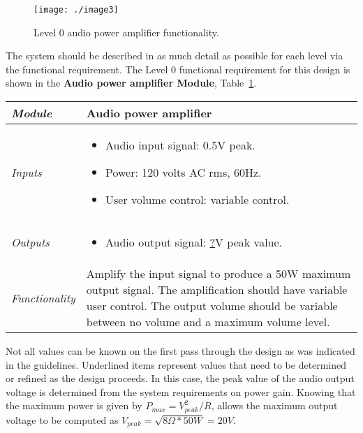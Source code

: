 \begin{figure}[h]
\centering
\texttt{[image: ./image3]}
\caption{Level 0 audio power amplifier functionality.}
\label{figure:level0PowerAmp}
\end{figure}

The system should be described in as much detail as possible for each
level via the functional requirement. The Level 0 functional requirement
for this design is shown in the \textbf{Audio power amplifier Module},
Table~\ref{table:functionalRequirementsAudioPowerAmplifier}.

\begin{table}[h]
\label{table:functionalRequirementsAudioPowerAmplifier}
\begin{tabular}{|l|m{10cm}|}
\hline
\emph{Module} &
Audio power amplifier \\ \hline

\emph{Inputs} & 
\begin{itemize}
\item
  Audio input signal: 0.5V peak.
\item
  Power: 120 volts AC rms, 60Hz.
\item
  User volume control: variable control.
\end{itemize} \\ \hline

\emph{Outputs} & 
\begin{itemize}
\item
  Audio output signal: \ul{?}V peak value.
\end{itemize}  \\ \hline

\emph{Functionality} & Amplify the input signal to produce a 50W maximum
output signal. The amplification should have variable user control. The
output volume should be variable between no volume and a maximum volume
level. \\ \hline
\end{tabular}
\end{table}

Not all values can be known on the first pass through the design as was
indicated in the guidelines. Underlined items represent values that need
to be determined or refined as the design proceeds. In this case, the
peak value of the audio output voltage is determined from the system
requirements on power gain. Knowing that the maximum power is given by
$P_{max} = V_{peak}^2 / R$, allows the maximum output voltage to be 
computed as  $V_{peak} = \sqrt{8\Omega*50W} = 20V$.

